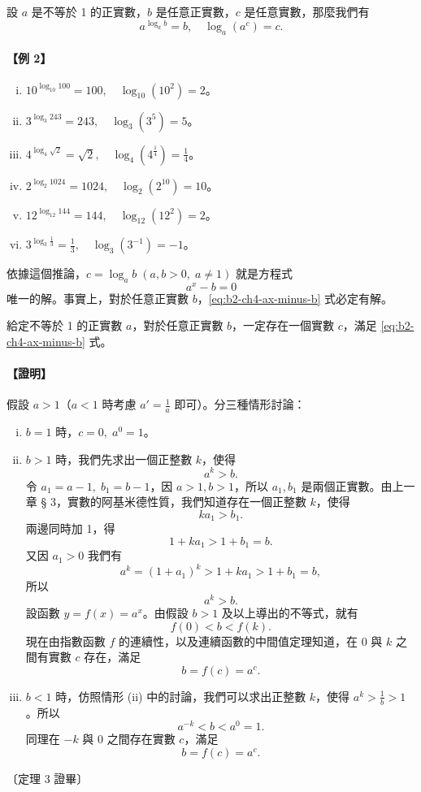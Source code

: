 \begin{prop}[推論]
設 $a$ 是不等於 1 的正實數，$b$ 是任意正實數，$c$ 是任意實數，那麼我們有
\[
a^{\log_a b} = b, \quad \log_a(a^c) = c.
\]
\end{prop}

\paragraph{【例 2】}
\begin{enumerate}[(i)]
    \item $10^{\log_{10} 100} = 100,\quad \log_{10}(10^2) = 2$。
    \item $3^{\log_3 243} = 243,\quad \log_3(3^5) = 5$。
    \item $4^{\log_4 \sqrt{2}} = \sqrt{2},\quad \log_4(4^{\frac{1}{4}}) = \frac{1}{4}$。
    \item $2^{\log_2 1024} = 1024,\quad \log_2(2^{10}) = 10$。
    \item $12^{\log_{12} 144} = 144,\quad \log_{12}(12^2) = 2$。
    \item $3^{\log_3 \frac{1}{3}} = \frac{1}{3},\quad \log_3(3^{-1}) = -1$。
\end{enumerate}

依據這個推論，$c = \log_a b\; (a, b > 0,\; a \neq 1)$ 就是方程式
\begin{equation}
a^x - b = 0 \label{eq:b2-ch4-ax-minus-b}
\end{equation}
唯一的解。事實上，對於任意正實數 $b$，\eqref{eq:b2-ch4-ax-minus-b} 式必定有解。

\begin{theorem}
給定不等於 1 的正實數 $a$，對於任意正實數 $b$，一定存在一個實數 $c$，滿足 \eqref{eq:b2-ch4-ax-minus-b} 式。
\end{theorem}
\paragraph{【證明】} 假設 $a > 1$（$a < 1$ 時考慮 $a' = \frac{1}{a}$ 即可）。分三種情形討論：
\begin{enumerate}[(i)]
    \item $b = 1$ 時，$c = 0,\; a^0 = 1$。
    \item $b > 1$ 時，我們先求出一個正整數 $k$，使得
    \[
    a^k > b.
    \]
    令 $a_1 = a-1,\; b_1 = b-1$，因 $a > 1, b > 1$，所以 $a_1, b_1$ 是兩個正實數。由上一章 § 3，實數的阿基米德性質，我們知道存在一個正整數 $k$，使得
    \[
    k a_1 > b_1.
    \]
    兩邊同時加 1，得
    \[
    1 + k a_1 > 1 + b_1 = b.
    \]
    又因 $a_1 > 0$ 我們有
    \[
    a^k = (1+a_1)^k > 1 + k a_1 > 1 + b_1 = b,
    \]
    所以
    \[
    a^k > b.
    \]
    設函數 $y = f(x) = a^x$。由假設 $b > 1$ 及以上導出的不等式，就有
    \[
    f(0) < b < f(k).
    \]
    現在由指數函數 $f$ 的連續性，以及連續函數的中間值定理知道，在 0 與 $k$ 之間有實數 $c$ 存在，滿足
    \[
    b = f(c) = a^c.
    \]
    \item $b < 1$ 時，仿照情形 (ii) 中的討論，我們可以求出正整數 $k$，使得 $a^k > \frac{1}{b} > 1$。所以
    \[
    a^{-k} < b < a^0 = 1.
    \]
    同理在 $-k$ 與 0 之間存在實數 $c$，滿足
    \[
    b = f(c) = a^c.
    \]
\end{enumerate}
\hfill〔定理 3 證畢〕

